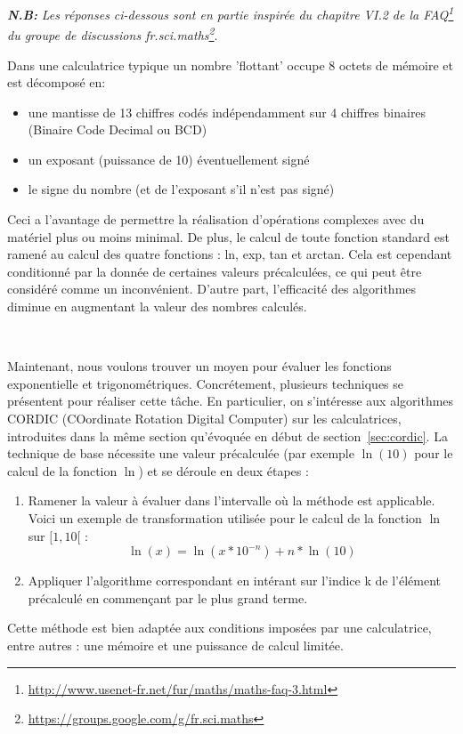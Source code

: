 \documentclass{article}
\begin{document}
{\small \textit{\textbf{N.B:}} \emph{ Les réponses ci-dessous sont en partie inspirée du chapitre VI.2 de la FAQ\footnote{\url{http://www.usenet-fr.net/fur/maths/maths-faq-3.html}} du groupe de discussions fr.sci.maths\footnote{\url{https://groups.google.com/g/fr.sci.maths}}}.
  \vskip 0.01mm ~
 
  Dans une calculatrice typique un nombre 'flottant' occupe 8 octets de m\'emoire et est d\'ecompos\'e en:
  \begin{itemize}
     \item une mantisse de 13 chiffres cod\'es ind\'ependamment sur 4 chiffres binaires (Binaire Code Decimal ou BCD)
     \item un exposant (puissance de 10) \'eventuellement sign\'e
     \item le signe du nombre (et de l'exposant s'il n'est pas sign\'e)
  \end{itemize}

  
  Ceci a l'avantage de permettre la r\'ealisation d'op\'erations complexes avec du mat\'eriel plus ou moins minimal. De plus, le calcul de toute fonction standard est ramen\'e au calcul des quatre fonctions : ln, exp, tan et arctan. Cela est cependant conditionn\'e par la donnée de certaines valeurs pr\'ecalcul\'ees, ce qui peut \^etre consid\'er\'e comme un inconv\'enient. D'autre part, l'efficacit\'e des algorithmes diminue en augmentant la valeur des nombres calcul\'es.

  \vskip 1mm ~


  Maintenant, nous voulons trouver un moyen pour évaluer les fonctions exponentielle et trigonométriques. Concr\'etement, plusieurs techniques se pr\'esentent pour r\'ealiser cette t\^ache. En particulier, on s'int\'eresse aux algorithmes CORDIC (COordinate Rotation Digital Computer) sur les calculatrices, introduites dans la m\^eme section qu'évoquée en début de section~\ref{sec:cordic}. La technique de base nécessite une valeur pr\'ecalcul\'ee (par exemple $\ln(10)$ pour le calcul de la fonction $\ln$) et se d\'eroule en deux \'etapes :
  \begin{enumerate}
  \item Ramener la valeur à \'evaluer dans l'intervalle où la m\'ethode est applicable. Voici un exemple de transformation utilis\'ee pour le calcul de la fonction $\ln$ sur $[1,10[$ :
      \begin{equation}
        \ln(x) = \ln(x*10^{-n}) + n*\ln(10)
      \end{equation}
    \item Appliquer l'algorithme correspondant en int\'erant sur l'indice k de l'\'el\'ement pr\'ecalcul\'e en commen\c cant par le plus grand terme.
  \end{enumerate}
  Cette m\'ethode est bien adapt\'ee aux conditions impos\'ees par une calculatrice, entre autres : une m\'emoire et une puissance de calcul limit\'ee.
  \vskip 1mm ~

}
\end{document}
